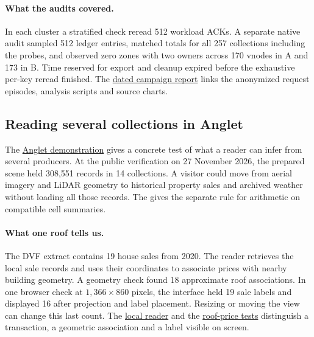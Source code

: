 \documentclass[11pt]{article}
\begin{document}
\paragraph{What the audits covered.}
In each cluster a stratified check reread 512 workload ACKs. A separate native audit sampled 512 ledger entries, matched totals for all 257 collections including the probes, and observed zero zones with two owners across 170 vnodes in A and 173 in B. Time reserved for export and cleanup expired before the exhaustive per-key reread finished. The \href{https://github.com/indexus/core/blob/e4b9072/docs/benchmarks/aws-placement-100-20261127/granular50/aws-pair.md}{dated campaign report} links the anonymized request episodes, analysis scripts and source charts.

\subsection*{Reading several collections in Anglet}\hypertarget{ix:anglet}{}
The \href{https://demo.indexus.io/?scene=anglet-mini}{Anglet demonstration} gives a concrete test of what a reader can infer from several producers. At the public verification on 27 November 2026, the prepared scene held 308,551 records in 14 collections. A visitor could move from aerial imagery and LiDAR geometry to historical property sales and archived weather without loading all those records. The  gives the separate rule for arithmetic on compatible cell summaries.

\paragraph{What one roof tells us.}
The DVF extract contains 19 house sales from 2020. The reader retrieves the local sale records and uses their coordinates to associate prices with nearby building geometry. A geometry check found 18 approximate roof associations. In one browser check at $1{,}366\times860$ pixels, the interface held 19 sale labels and displayed 16 after projection and label placement. Resizing or moving the view can change this last count. The \href{https://github.com/indexus/experiences/blob/c0e9738/src/experiences/explore/localSales.js}{local reader} and the \href{https://github.com/indexus/experiences/blob/c0e9738/test/explore/roof-prices.test.js}{roof-price tests} distinguish a transaction, a geometric association and a label visible on screen.
\end{document}
